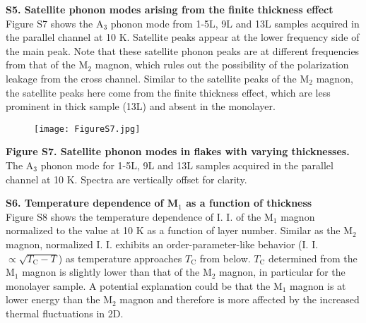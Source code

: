 \documentclass[prl, preprint, superscriptaddress]{revtex4-1}
\begin{document}

\newpage

\noindent\textbf{S5. Satellite phonon modes arising from the finite thickness effect}\\

\noindent Figure S7 shows the $\mathrm{A}_3$ phonon mode from 1-5L, 9L and 13L samples acquired in the parallel channel at 10 K. Satellite peaks appear at the lower frequency side of the main peak. Note that these satellite phonon peaks are at different frequencies from that of the $\mathrm{M}_2$ magnon, which rules out the possibility of the polarization leakage from the cross channel. Similar to the satellite peaks of the $\mathrm{M}_2$ magnon, the satellite peaks here come from the finite thickness effect, which are less prominent in thick sample (13L) and absent in the monolayer.

\begin{figure}[!h]
\texttt{[image: FigureS7.jpg]}
\end{figure}
\vspace{-5pt}
\begin{footnotesize}
\noindent\textbf{Figure S7. Satellite phonon modes in  flakes with varying thicknesses. } The $\mathrm{A}_3$ phonon mode for 1-5L, 9L and 13L samples acquired in the parallel channel at 10 K. Spectra are vertically offset for clarity.  \\
\end{footnotesize}


\newpage

\noindent\textbf{S6. Temperature dependence of $\mathrm{\textbf{M}}_1$ as a function of thickness}\\

\noindent Figure S8 shows the temperature dependence of I. I. of the $\mathrm{M}_1$ magnon normalized to the value at 10 K as a function of layer number. Similar as the $\mathrm{M}_2$ magnon, normalized I. I. exhibits an order-parameter-like behavior (I. I. $\propto \sqrt{T_\mathrm{C}-T}$) as temperature approaches $T_\mathrm{C}$ from below. $T_\mathrm{C}$ determined from the $\mathrm{M}_1$ magnon is slightly lower than that of the $\mathrm{M}_2$ magnon, in particular for the monolayer sample. A potential explanation could be that the $\mathrm{M}_1$ magnon is at lower energy than the $\mathrm{M}_2$ magnon and therefore is more affected by the increased thermal fluctuations in 2D.
\end{document}
